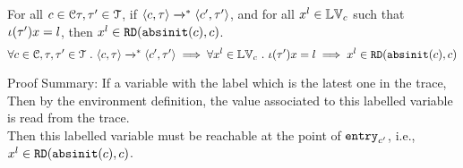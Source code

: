 %
\begin{lem}
\label{lem:inv_live}
For all $c \in \mathcal{C} \mathtt{\tau}, \mathtt{\tau}' \in \mathcal{T} $, if 
$\langle c, \mathtt{\tau} \rangle \xrightarrow{}^* \langle c', \mathtt{\tau}' \rangle$,
and for all $x^l \in \mathbb{LV}_c$ such that 
$\iota(\mathtt{\tau}') x = l $, then $x^l \in \mathtt{RD}(\mathtt{abs}{\mathtt{init}}(c), c)$.
%
\[
	\forall c \in \mathcal{C} , \mathtt{\tau}, \mathtt{\tau}' \in \mathcal{T} ~.~
	\langle c, \mathtt{\tau} \rangle \xrightarrow{}^* \langle c', \mathtt{\tau}' \rangle
	\implies
	\forall x^l \in \mathbb{LV}_c ~.~ \iota(\mathtt{\tau}') x = l \implies x^l \in \mathtt{RD}(\mathtt{abs}{\mathtt{init}}(c), c)
\]
\end{lem}
Proof Summary: 
If a variable with the label which is the latest one in the trace,
Then by the environment definition, the value associated to this labelled variable is read from the trace.
\\
Then this labelled variable must be reachable at the point of $\mathtt{entry}_{c'}$, i.e., 
$x^l \in \mathtt{RD}(\mathtt{abs}{\mathtt{init}}(c), c)$.
